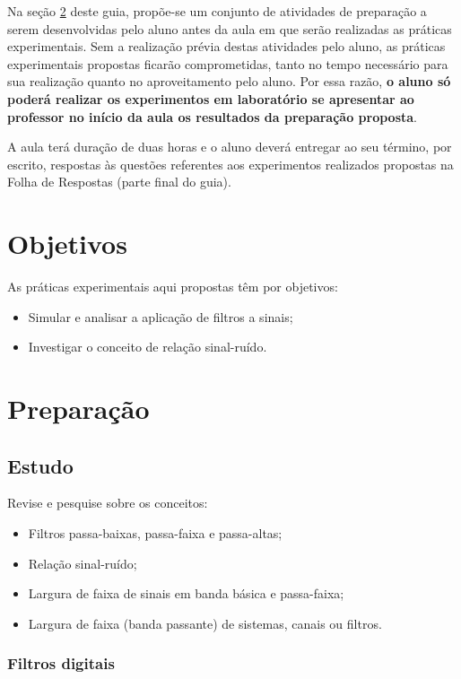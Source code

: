 \documentclass[12pt,addpoints]{exam}
\begin{document}
Na seção \ref{sect:Preparacao} deste guia, propõe-se um conjunto de atividades de preparação a serem desenvolvidas pelo aluno antes da aula em que serão realizadas as práticas experimentais. Sem a realização prévia destas atividades pelo aluno, as práticas experimentais propostas ficarão comprometidas, tanto no tempo necessário para sua realização quanto no aproveitamento pelo aluno. Por essa razão, \textbf{o aluno só poderá realizar os experimentos em laboratório se apresentar ao professor no início da aula os resultados da preparação proposta}. 

A aula terá duração de duas horas e o aluno deverá entregar ao seu término, por escrito, respostas às questões referentes aos experimentos realizados propostas na Folha de Respostas (parte final do guia).

\section{Objetivos}

As práticas experimentais aqui propostas têm por objetivos:
\begin{itemize}
    \item Simular e analisar a aplicação de filtros a sinais;
    \item Investigar o conceito de relação sinal-ruído.
\end{itemize}

\section{Preparação} \label{sect:Preparacao}

\subsection{Estudo}

Revise e pesquise sobre os conceitos:
\begin{itemize}
    \item Filtros passa-baixas, passa-faixa e passa-altas;
    \item Relação sinal-ruído;
    \item Largura de faixa de sinais em banda básica e passa-faixa; 
    \item Largura de faixa (banda passante) de sistemas, canais ou filtros.
\end{itemize}

\subsubsection{Filtros digitais}
\label{sec:filtros}
\end{document}
